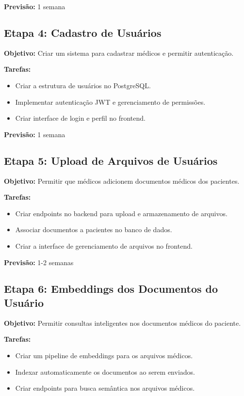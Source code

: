 \textbf{Previsão:} 1 semana

\subsection{Etapa 4: Cadastro de Usuários}

\textbf{Objetivo:} Criar um sistema para cadastrar médicos e permitir autenticação.

\textbf{Tarefas:}
\begin{itemize}
    \item Criar a estrutura de usuários no PostgreSQL.
    \item Implementar autenticação JWT e gerenciamento de permissões.
    \item Criar interface de login e perfil no frontend.
\end{itemize}

\textbf{Previsão:} 1 semana

\subsection{Etapa 5: Upload de Arquivos de Usuários}

\textbf{Objetivo:} Permitir que médicos adicionem documentos médicos dos pacientes.

\textbf{Tarefas:}
\begin{itemize}
    \item Criar endpoints no backend para upload e armazenamento de arquivos.
    \item Associar documentos a pacientes no banco de dados.
    \item Criar a interface de gerenciamento de arquivos no frontend.
\end{itemize}

\textbf{Previsão:} 1-2 semanas

\subsection{Etapa 6: Embeddings dos Documentos do Usuário}

\textbf{Objetivo:} Permitir consultas inteligentes nos documentos médicos do paciente.

\textbf{Tarefas:}
\begin{itemize}
    \item Criar um pipeline de embeddings para os arquivos médicos.
    \item Indexar automaticamente os documentos ao serem enviados.
    \item Criar endpoints para busca semântica nos arquivos médicos.
\end{itemize}

